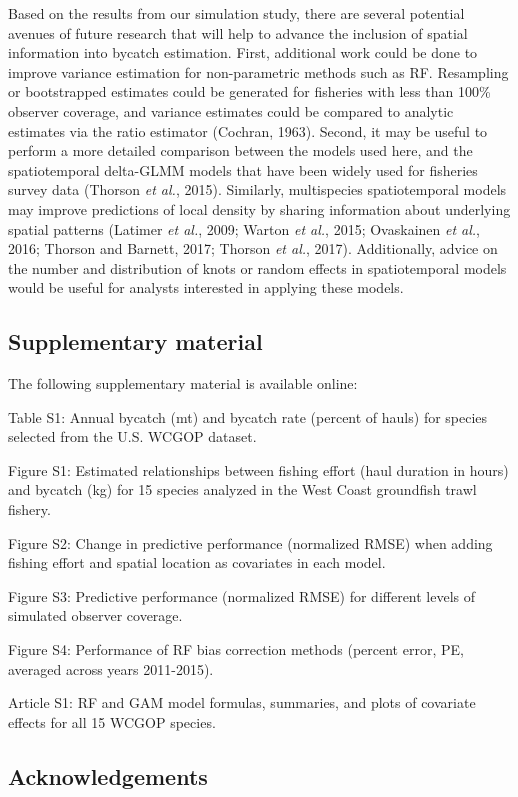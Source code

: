 \documentclass[]{article}
\begin{document}
Based on the results from our simulation study, there are several
potential avenues of future research that will help to advance the
inclusion of spatial information into bycatch estimation. First,
additional work could be done to improve variance estimation for
non-parametric methods such as RF. Resampling or bootstrapped estimates
could be generated for fisheries with less than 100\% observer coverage,
and variance estimates could be compared to analytic estimates via the
ratio estimator (Cochran, 1963). Second, it may be useful to perform a
more detailed comparison between the models used here, and the
spatiotemporal delta-GLMM models that have been widely used for
fisheries survey data (Thorson \emph{et al.}, 2015). Similarly,
multispecies spatiotemporal models may improve predictions of local
density by sharing information about underlying spatial patterns
(Latimer \emph{et al.}, 2009; Warton \emph{et al.}, 2015; Ovaskainen
\emph{et al.}, 2016; Thorson and Barnett, 2017; Thorson \emph{et al.},
2017). Additionally, advice on the number and distribution of knots or
random effects in spatiotemporal models would be useful for analysts
interested in applying these models.

\subsection{Supplementary material}\label{supplementary-material}

The following supplementary material is available online:

Table S1: Annual bycatch (mt) and bycatch rate (percent of hauls) for
species selected from the U.S. WCGOP dataset.

Figure S1: Estimated relationships between fishing effort (haul duration
in hours) and bycatch (kg) for 15 species analyzed in the West Coast
groundfish trawl fishery.

Figure S2: Change in predictive performance (normalized RMSE) when
adding fishing effort and spatial location as covariates in each model.

Figure S3: Predictive performance (normalized RMSE) for different levels
of simulated observer coverage.

Figure S4: Performance of RF bias correction methods (percent error, PE,
averaged across years 2011-2015).

Article S1: RF and GAM model formulas, summaries, and plots of covariate
effects for all 15 WCGOP species.

\subsection{Acknowledgements}\label{acknowledgements}
\end{document}
